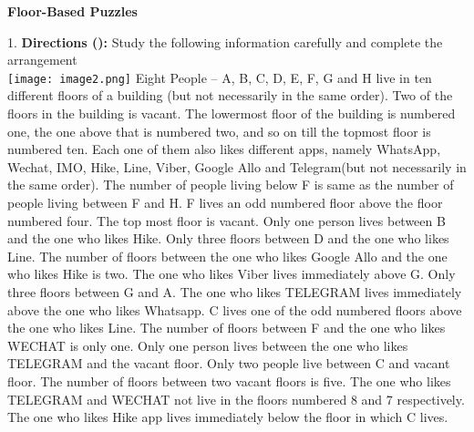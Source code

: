 \documentclass[
]{article}
\author{}
\date{}
\begin{document}
	
 

\begin{center}
	{\Large \textbf{Floor-Based Puzzles \\}}
\end{center}

1. \textbf{Directions ():} Study the following information carefully and complete the arrangement\\
\texttt{[image: image2.png]}
Eight People – A, B, C, D, E, F, G and H live in ten different floors of a building (but not
necessarily in the same order). Two of the floors in the building is vacant. The lowermost
floor of the building is numbered one, the one above that is numbered two, and so on till the
topmost floor is numbered ten. Each one of them also likes different apps, namely
WhatsApp, Wechat, IMO, Hike, Line, Viber, Google Allo and Telegram(but not necessarily
in the same order). The number of people living below F is same as the number of people
living between F and H. F lives an odd numbered floor above the floor numbered four. The
top most floor is vacant. Only one person lives between B and the one who likes Hike. Only
three floors between D and the one who likes Line. The number of floors between the one
who likes Google Allo and the one who likes Hike is two. The one who likes Viber lives
immediately above G. Only three floors between G and A. The one who likes TELEGRAM
lives immediately above the one who likes Whatsapp. C lives one of the odd numbered
floors above the one who likes Line. The number of floors between F and the one who likes
WECHAT is only one. Only one person lives between the one who likes TELEGRAM and
the vacant floor. Only two people live between C and vacant floor. The number of floors
between two vacant floors is five. The one who likes TELEGRAM and WECHAT not live in
the floors numbered 8 and 7 respectively. The one who likes Hike app lives immediately
below the floor in which C lives.\\
\end{document}
